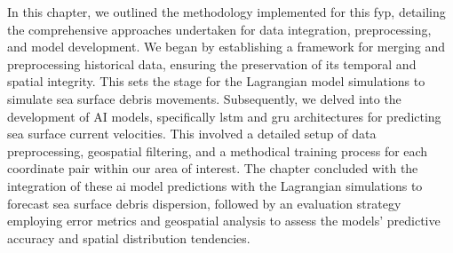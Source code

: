 In this chapter, we outlined the methodology implemented for this \acrshort{fyp}, detailing the comprehensive approaches undertaken for data integration, preprocessing, and model development. We began by establishing a framework for merging and preprocessing historical data, ensuring the preservation of its temporal and spatial integrity. This sets the stage for the Lagrangian model simulations to simulate sea surface debris movements. Subsequently, we delved into the development of AI models, specifically \acrshort{lstm} and \acrshort{gru} architectures for predicting sea surface current velocities. This involved a detailed setup of data preprocessing, geospatial filtering, and a methodical training process for each coordinate pair within our area of interest. The chapter concluded with the integration of these \acrshort{ai} model predictions with the Lagrangian simulations to forecast sea surface debris dispersion, followed by an evaluation strategy employing error metrics and geospatial analysis to assess the models' predictive accuracy and spatial distribution tendencies.